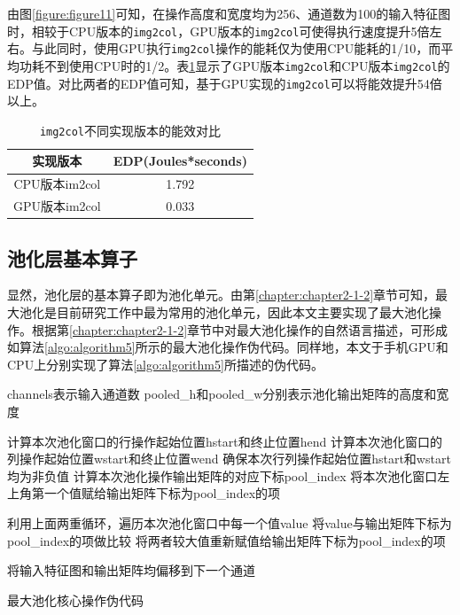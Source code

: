 由图\ref{figure:figure11}可知，在操作高度和宽度均为256、通道数为100的输入特征图时，相较于CPU版本的\texttt{img2col}，GPU版本的\texttt{img2col}可使得执行速度提升5倍左右。与此同时，使用GPU执行\texttt{img2col}操作的能耗仅为使用CPU能耗的1/10，而平均功耗不到使用CPU时的1/2。表\ref{table:table2}显示了GPU版本\texttt{img2col}和CPU版本\texttt{img2col}的EDP值。对比两者的EDP值可知，基于GPU实现的\texttt{img2col}可以将能效提升54倍以上。

\begin{table}[htbp]
  \centering
  \caption{\texttt{img2col}不同实现版本的能效对比}
  \label{table:table2}
  \begin{tabular}{cc}
    \toprule
      实现版本 & EDP(Joules*seconds) \\
    \midrule
      CPU版本im2col & 1.792 \\
      GPU版本im2col & 0.033 \\
    \bottomrule
  \end{tabular}
\end{table}


\subsection{池化层基本算子}

显然，池化层的基本算子即为池化单元。由第\ref{chapter:chapter2-1-2}章节可知，最大池化是目前研究工作中最为常用的池化单元，因此本文主要实现了最大池化操作。根据第\ref{chapter:chapter2-1-2}章节中对最大池化操作的自然语言描述，可形成如算法\ref{algo:algorithm5}所示的最大池化操作伪代码。同样地，本文于手机GPU和CPU上分别实现了算法\ref{algo:algorithm5}所描述的伪代码。

\begin{algorithm}[htbp]
  \small
  \SetAlgoLined
    \begin{spacing}{0.8}
    channels表示输入通道数\;
    pooled\_h和pooled\_w分别表示池化输出矩阵的高度和宽度\;
     {
         {
             {
                计算本次池化窗口的行操作起始位置hstart和终止位置hend\;
                计算本次池化窗口的列操作起始位置wstart和终止位置wend\;
                确保本次行列操作起始位置hstart和wstart均为非负值\;
                计算本次池化操作输出矩阵的对应下标pool\_index\;
                将本次池化窗口左上角第一个值赋给输出矩阵下标为pool\_index的项\;

                 {
                     {
                      利用上面两重循环，遍历本次池化窗口中每一个值value\;
                        将value与输出矩阵下标为pool\_index的项做比较\;
                      将两者较大值重新赋值给输出矩阵下标为pool\_index的项\;
                    }
                }
            }
        }
        将输入特征图和输出矩阵均偏移到下一个通道\;
    }
    \end{spacing}
  \caption{最大池化核心操作伪代码}
  \label{algo:algorithm5}
\end{algorithm}

